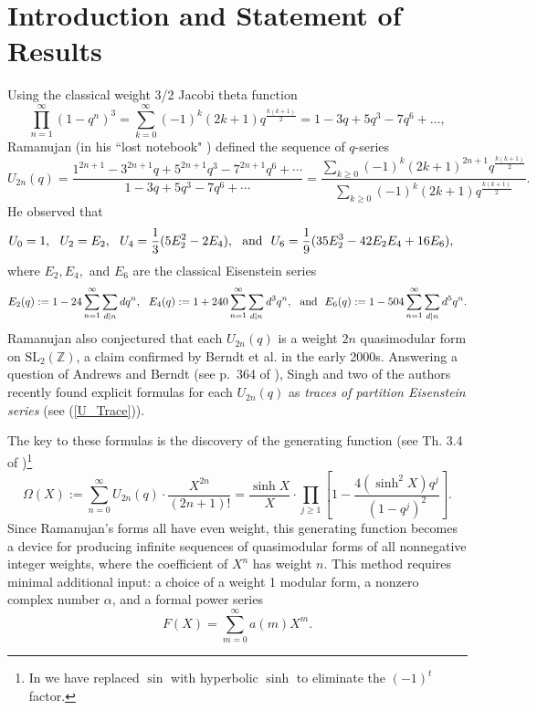 \documentclass[11pt]{amsart}
\theoremstyle{definition}
\theoremstyle{remark}
\numberwithin{equation}{section}
\newcommand{\SL}{\mathrm{SL}}
\newcommand{\Z}{\mathbb Z}
\begin{document}
\section{Introduction and Statement of Results}
Using the classical weight 3/2 Jacobi theta function \cite[Thm. 1.60]{CBMS}
$$
\prod_{n=1}^{\infty} (1-q^n)^3 =
\sum_{k=0}^{\infty} (-1)^k (2k+1)q^{\frac{k(k+1)}{2}}=1-3q+5q^3-7q^6+\dots,
$$
Ramanujan (in his ``lost notebook" \cite[p. 369]{Rama})  defined the sequence of $q$-series
\begin{equation} \label{U}
U_{2n}(q)=\frac{1^{2n+1}-3^{2n+1}q+5^{2n+1}q^3-7^{2n+1}q^6+\cdots}{1-3q+5q^3-7q^6+\cdots}
=\frac{\sum_{k\geq0}(-1)^k(2k+1)^{2n+1} q^{\frac{k(k+1)}{2}}}{\sum_{k\geq0}(-1)^k (2k+1)q^{\frac{k(k+1)}2}}.
 \end{equation}
 He observed that
\begin{displaymath}
\begin{split}
&U_0=1,\ \ U_2=E_2,\ \ U_4=\frac13(5E_2^2-2E_4),\ \ {\text {\rm and}}\ \  U_6=\frac19(35E_2^3-42E_2E_4+16E_6),
\end{split}
\end{displaymath}
where $E_2, E_4,$ and $E_6$ are the classical Eisenstein series
\begin{displaymath}
\begin{split}
E_2(q):=1-24\sum_{n=1}^{\infty} \sum_{d\mid n}dq^n,\ \ 
E_4(q):=1+240\sum_{n=1}^{\infty}\sum_{d\mid n}d^3q^n, \ \  {\text {\rm and}}\ \ 
E_6(q):=1-504\sum_{n=1}^{\infty} \sum_{d\mid n}d^5q^n.
\end{split}
\end{displaymath}
Ramanujan also conjectured that each $U_{2n}(q)$ is a weight $2n$ quasimodular form on $\SL_2(\Z)$, a claim confirmed by Berndt et al. \cite{Berndt1, Berndt2} in the early 2000s. 
Answering a question of Andrews and Berndt (see p.~364 of \cite{AndrewsBerndt}), 
Singh and two of the authors recently found explicit formulas \cite{AOS} for each $U_{2n}(q)$ as {\it traces of partition Eisenstein series} (see (\ref{U_Trace})).

The key to these formulas is the discovery of the generating function (see Th. 3.4 of \cite{AOS})\footnote{In \cite[Thm. 3.4]{AOS}  we have replaced $\sin$ with hyperbolic $\sinh$ to eliminate the $(-1)^t$ factor.}
\begin{equation}\label{UGenFunction}
\Omega(X):=\sum_{n=0}^{\infty}  U_{2n}(q)\cdot \frac{X^{2n}}{(2n+1)!}=\frac{\sinh X}X \cdot \prod_{j\geq1}\left[1-\frac{4(\sinh^2X)q^j}{(1-q^j)^2}\right].
\end{equation}
Since Ramanujan's forms all have even weight, this generating function becomes a device for producing infinite sequences of quasimodular forms of all nonnegative integer weights, where the coefficient of $X^n$ has weight $n$. This method requires minimal additional input: a choice of a weight 1 modular form, a nonzero complex number $\alpha$, and a formal power series $$F(X)=\sum_{m=0}^{\infty}a(m)X^m.$$ 
\end{document}
